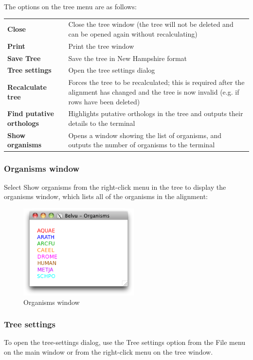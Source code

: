 \documentclass[letterpaper]{article}
\begin{document}
The options on the tree menu are as follows:

\begin{supertabular}{>{\bfseries}p{0.2\textwidth} p{0.8\textwidth}}
Close &
Close the tree window (the tree will not be deleted and can be opened again without recalculating)\\
Print &
Print the tree window\\
Save Tree &
Save the tree in New Hampshire format\\
Tree settings &
Open the tree settings dialog\\
Recalculate tree &
Forces the tree to be recalculated; this is required after the alignment has changed and the tree is now invalid (e.g. if rows have been deleted)\\
Find putative orthologs &
Highlights putative orthologs in the tree and outputs their details to the terminal\\
Show organisms &
Opens a window showing the list of organisms, and outputs the number of organisms to the terminal\\
\end{supertabular}


\subsubsection[Organisms window]{Organisms window}
Select {\textquotesingle}Show organisms{\textquotesingle} from the right-click menu in the tree to display the organisms window, which lists all of the organisms in the alignment: 

\begin{figure}[htb]
\centering
\color{lightblue}
\includegraphics[width=6cm]{img_window_organisms.png}
\caption{Organisms window}
\label{fig:organisms}
\end{figure}


\subsubsection[Tree settings]{Tree settings}
\label{bkm:RefHeading45661104073125}To open the tree-settings dialog, use the {\textquotesingle}Tree settings{\textquotesingle} option from the File menu on the main window or from the right-click menu on the tree window.
\end{document}
